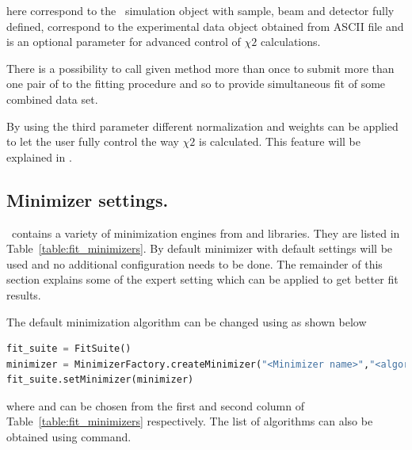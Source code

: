 here  correspond to the \BornAgain\ simulation object with sample, beam and detector fully defined,  correspond to the experimental data object obtained from ASCII file and  is an optional parameter for advanced 
control of $\chi2$ calculations.

There is a possibility to call given method more than once to submit more than one pair of
 to the fitting procedure and so to provide simultaneous fit of
some combined data set.

By using the third  parameter different normalization and weights
can be applied to let the user fully control the way $\chi2$ is calculated.
This feature will be explained in .


%
\subsection{Minimizer settings.}

\BornAgain\ contains a variety of minimization engines from  and 
libraries. They are listed in Table~\ref{table:fit_minimizers}.
By default  minimizer with default settings will be used and no additional
configuration needs to be done.
The remainder of this section explains some of the expert setting which can be applied to get better 
fit results.

The default minimization algorithm can be changed using 
 as shown below
\begin{lstlisting}[language=python, style=eclipseboxed,numbers=none]
fit_suite = FitSuite()
minimizer = MinimizerFactory.createMinimizer("<Minimizer name>","<algorithm>")
fit_suite.setMinimizer(minimizer)
\end{lstlisting}

where  and  can be chosen from the first and
second column of Table~\ref{table:fit_minimizers} respectively. 
The list of algorithms
can also be obtained using  command.


